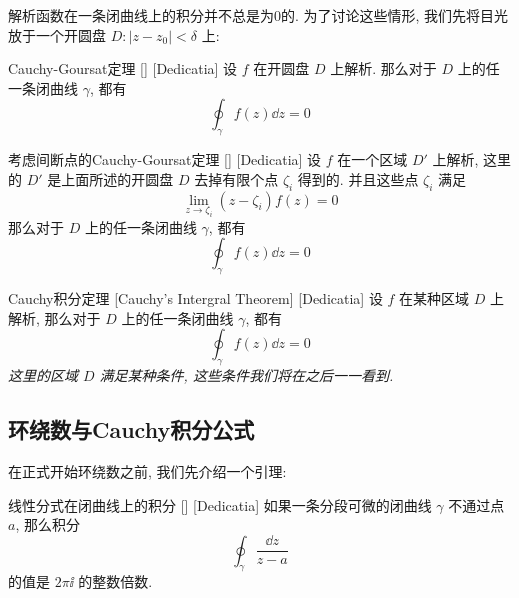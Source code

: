 \documentclass[UTF8]{ctexart}
\begin{document}
        解析函数在一条闭曲线上的积分并不总是为0的. 为了讨论这些情形, 我们先将目光放于一个开圆盘 \(D: |z-z_0|<\delta \) 上:

        \begin{thm}
            [UUID]
            {Cauchy-Goursat定理}
            []
            [Dedicatia]
            设 \(f\) 在开圆盘 \(D\) 上解析. 那么对于 \(D\) 上的任一条闭曲线 \(\gamma\), 都有
            \[\oint_\gamma f(z)\dd{z}=0\]
        \end{thm}
        
        \begin{thm}
            [UUID]
            {考虑间断点的Cauchy-Goursat定理}
            []
            [Dedicatia]
            设 \(f\) 在一个区域 \(D'\) 上解析, 这里的 \(D'\) 是上面所述的开圆盘 \(D\) 去掉有限个点 \(\zeta_i\) 得到的. 并且这些点 \(\zeta_i\) 满足
            \[\lim_{z\to\zeta_i }(z-\zeta_i)f(z)=0\]
            那么对于 \(D\) 上的任一条闭曲线 \(\gamma\), 都有
            \[\oint_\gamma f(z)\dd{z}=0\]
        \end{thm}
        
        \begin{thm}
            [Cauchy]
            {Cauchy积分定理}
            [Cauchy's Intergral Theorem]
            [Dedicatia]
            设 \(f\) 在某种区域 \(D\) 上解析, 那么对于 \(D\) 上的任一条闭曲线 \(\gamma\), 都有
            \[\oint_\gamma f(z)\dd{z}=0\]
            \textit{这里的区域 \(D\) 满足某种条件, 这些条件我们将在之后一一看到. }
        \end{thm}

    \subsection{环绕数与Cauchy积分公式}

        在正式开始环绕数之前, 我们先介绍一个引理:

        \begin{lma}
            [UUID]
            {线性分式在闭曲线上的积分}
            []
            [Dedicatia]
            如果一条分段可微的闭曲线 \(\gamma\) 不通过点 \(a\), 那么积分
            \[\oint_\gamma\frac{\dd{z}}{z-a} \]
            的值是 \(2\pi\ii\) 的整数倍数. 
        \end{lma}
\end{document}
